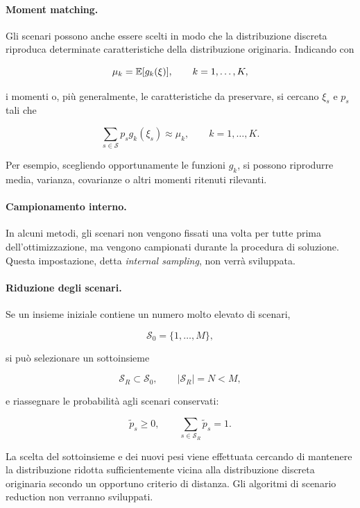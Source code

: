 \paragraph{Moment matching.}

Gli scenari possono anche essere scelti in modo che la distribuzione discreta
riproduca determinate caratteristiche della distribuzione originaria.
Indicando con

\[
\mu_k=\mathbb{E}[g_k(\xi)],
\qquad
k=1,\ldots,K,
\]

\noindent i momenti o, pi\`u generalmente, le caratteristiche da preservare, si cercano
$\xi_s$ e $p_s$ tali che

\[
\sum_{s\in\mathcal S}
p_s g_k(\xi_s)
\approx
\mu_k,
\qquad
k=1,\ldots,K.
\]

Per esempio, scegliendo opportunamente le funzioni $g_k$, si possono
riprodurre media, varianza, covarianze o altri momenti ritenuti rilevanti.

\paragraph{Campionamento interno.}

In alcuni metodi, gli scenari non vengono fissati una volta per tutte prima
dell'ottimizzazione, ma vengono campionati durante la procedura di soluzione.
Questa impostazione, detta \emph{internal sampling}, non verr\`a sviluppata.

\paragraph{Riduzione degli scenari.}

Se un insieme iniziale contiene un numero molto elevato di scenari,

\[
\mathcal S_0=\{1,\ldots,M\},
\]

\noindent si pu\`o selezionare un sottoinsieme

\[
\mathcal S_R\subset\mathcal S_0,
\qquad
|\mathcal S_R|=N<M,
\]

\noindent e riassegnare le probabilit\`a agli scenari conservati:

\[
\widetilde p_s\geq0,
\qquad
\sum_{s\in\mathcal S_R}\widetilde p_s=1.
\]

La scelta del sottoinsieme e dei nuovi pesi viene effettuata cercando di
mantenere la distribuzione ridotta sufficientemente vicina alla
distribuzione discreta originaria secondo un opportuno criterio di distanza.
Gli algoritmi di scenario reduction non verranno sviluppati.

